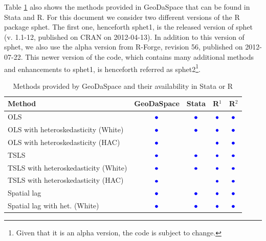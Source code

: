 \documentclass{article}
\begin{document}
Table \ref{t:methods} also shows the methods provided in GeoDaSpace that can be found in Stata and R. For this document we consider two different versions of the R package sphet. The first one, henceforth sphet1, is the released version of sphet (v. 1.1-12, published on CRAN on 2012-04-13). In addition to this version of sphet, we also use the alpha version from R-Forge, revision 56, published on 2012-07-22. This newer version of the code, which contains many additional methods and enhancements to sphet1, is henceforth referred as sphet2\footnote{Given that it is an alpha version, the code is subject to change.}.


\begin{table}[htpb]
\caption{Methods provided by GeoDaSpace and their availability in Stata or R}
\label{t:methods}
\centering
\begin{small}
\begin{tabular}{l|cccc} \hline
\textbf{Method}&\textbf{GeoDaSpace}&\textbf{Stata}&\textbf{R$^1$}&\textbf{R$^2$}\\ \hline
OLS&{\LARGE$\textcolor{blue}\bullet$}&{\LARGE$\textcolor{blue}\bullet$}&{\LARGE$\textcolor{blue}\bullet$}&{\LARGE$\textcolor{blue}\bullet$}\\
OLS with heteroskedasticity (White)&{\LARGE$\textcolor{blue}\bullet$}&{\LARGE$\textcolor{blue}\bullet$}&{\LARGE$\textcolor{blue}\bullet$}&{\LARGE$\textcolor{blue}\bullet$}\\
OLS with heteroskedasticity (HAC)&{\LARGE$\textcolor{blue}\bullet$}&&{\LARGE$\textcolor{blue}\bullet$}&{\LARGE$\textcolor{blue}\bullet$}\\
TSLS&{\LARGE$\textcolor{blue}\bullet$}&{\LARGE$\textcolor{blue}\bullet$}&{\LARGE$\textcolor{blue}\bullet$}&{\LARGE$\textcolor{blue}\bullet$}\\
TSLS with heteroskedasticity (White)&{\LARGE$\textcolor{blue}\bullet$}&{\LARGE$\textcolor{blue}\bullet$}&{\LARGE$\textcolor{blue}\bullet$}&{\LARGE$\textcolor{blue}\bullet$}\\
TSLS with heteroskedasticity (HAC)&{\LARGE$\textcolor{blue}\bullet$}&&{\LARGE$\textcolor{blue}\bullet$}&{\LARGE$\textcolor{blue}\bullet$}\\
Spatial lag&{\LARGE$\textcolor{blue}\bullet$}&{\LARGE$\textcolor{blue}\bullet$}&{\LARGE$\textcolor{blue}\bullet$}&{\LARGE$\textcolor{blue}\bullet$}\\
Spatial lag with het. (White)&{\LARGE$\textcolor{blue}\bullet$}&{\LARGE$\textcolor{blue}\bullet$}&{\LARGE$\textcolor{blue}\bullet$}&{\LARGE$\textcolor{blue}\bullet$}\\

\end{tabular}
\end{small}
\end{table}
\end{document}
